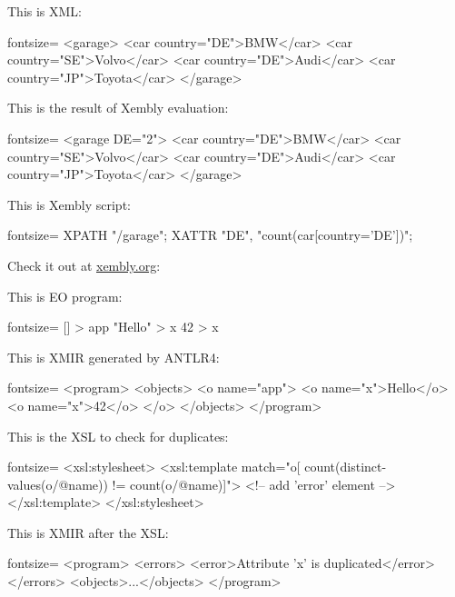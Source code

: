 \documentclass{article}
\begin{document}
\plush{}
\begin{pptWide}{2}
This is XML:
\begin{ffcode*}{fontsize=\scriptsize}
<garage>
  <car country="DE">BMW</car>
  <car country="SE">Volvo</car>
  <car country="DE">Audi</car>
  <car country="JP">Toyota</car>
</garage>
\end{ffcode*}
This is the result of Xembly evaluation:
\begin{ffcode*}{fontsize=\scriptsize}
<garage DE="2">
  <car country="DE">BMW</car>
  <car country="SE">Volvo</car>
  <car country="DE">Audi</car>
  <car country="JP">Toyota</car>
</garage>
\end{ffcode*}
\columnbreak
This is Xembly script:
\begin{ffcode*}{fontsize=\small}
XPATH "/garage";
XATTR "DE", "count(car[country='DE'])";
\end{ffcode*}
Check it out at \href{https://www.xembly.org}{xembly.org}:\par
{}
\end{pptWide}

\plush{}
\plick{$\dots$}


\begin{pptWide}{2}
This is EO program:
\begin{ffcode*}{fontsize=\scriptsize}
[] > app
  "Hello" > x
  42 > x
\end{ffcode*}
This is XMIR generated by ANTLR4:
\begin{ffcode*}{fontsize=\scriptsize}
<program>
  <objects>
    <o name="app">
      <o name="x">Hello</o>
      <o name="x">42</o>
    </o>
  </objects>
</program>
\end{ffcode*}
\columnbreak
This is the XSL to check for duplicates:
\begin{ffcode*}{fontsize=\scriptsize}
<xsl:stylesheet>
  <xsl:template match="o[
    count(distinct-values(o/@name)) !=
    count(o/@name)]">
    <!-- add 'error' element -->
  </xsl:template>
</xsl:stylesheet>
\end{ffcode*}
This is XMIR after the XSL:
\begin{ffcode*}{fontsize=\scriptsize}
<program>
  <errors>
    <error>Attribute 'x' is duplicated</error>
  </errors>
  <objects>...</objects>
</program>
\end{ffcode*}
\end{pptWide}
\end{document}
